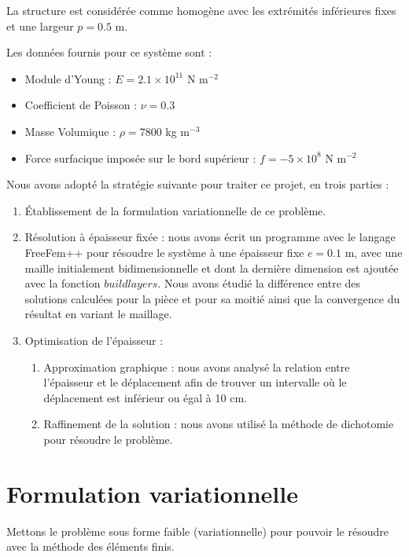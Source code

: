 \documentclass{article}
\begin{document}
    La structure est considérée comme homogène avec les extrémités inférieures fixes et une largeur $p = 0.5$ m. 
    
    Les données fournis pour ce système sont :
    
    \begin{itemize}
    \item Module d'Young : $E = 2.1 \times 10^{11}$ N m$^{-2}$
    \item Coefficient de Poisson : $\nu = 0.3$ 
    \item Masse Volumique : $\rho = 7800$ kg m$^{-3}$
    \item Force surfacique imposée sur le bord supérieur : $f= - 5 \times 10^8$ N m$^{-2}$
    \end{itemize}
    
    Nous avons adopté la stratégie suivante pour traiter ce projet, en trois parties :
    \begin{enumerate}
        \item Établissement de la formulation variationnelle de ce problème.
        \item Résolution à épaisseur fixée : nous avons écrit un programme avec le langage FreeFem++ pour résoudre le système à une épaisseur fixe $e = 0.1$ m, 
            avec une maille initialement bidimensionnelle et dont la dernière dimension est ajoutée avec la fonction $buildlayers$. 
            Nous avons étudié la différence entre des solutions calculées pour la pièce et pour sa moitié ainsi que la convergence du résultat en variant le maillage.
        \item Optimisation de l'épaisseur :
        \begin{enumerate}
            \item Approximation graphique : 
                nous avons analysé la relation entre l'épaisseur et le déplacement afin de trouver un intervalle où le déplacement est inférieur ou égal à 10 cm.
            \item Raffinement de la solution : nous avons utilisé la méthode de dichotomie pour résoudre le problème.
        \end{enumerate}
    \end{enumerate}

    \section{Formulation variationnelle}

    \begin{problem}{1}
    Mettons le problème sous forme faible (variationnelle) pour pouvoir le résoudre avec la méthode des éléments finis.
    \end{problem}
      
\end{document}
